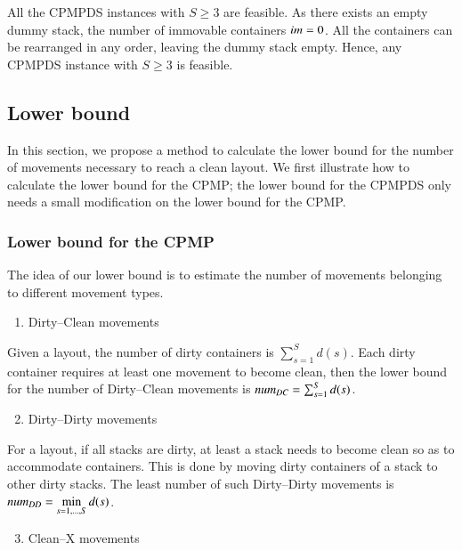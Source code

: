 \documentclass[review,3p,times,authoryear,12pt]{elsarticle}
\begin{document}
All the CPMPDS instances with $S\ge3$ are feasible. As there exists an empty dummy stack, the number of immovable containers $\id{im}=0$. All the containers can be rearranged in any order, leaving the dummy stack empty.
Hence, any CPMPDS instance with $S\ge3$ is feasible.

\subsection{Lower bound}

In this section, we propose a method to calculate the lower bound for the number of movements necessary to reach a clean layout. We first illustrate how to calculate the lower bound for the CPMP; the lower bound for the CPMPDS only needs a small modification on the lower bound for the CPMP.

\subsubsection{Lower bound for the CPMP}

The idea of our lower bound is to estimate the number of movements belonging to different movement types.
\begin{enumerate}
\setcounter{enumi}{0}
\item Dirty--Clean movements
\end{enumerate}

Given a layout, the number of dirty containers is $\sum_{s=1}^S d(s)$. Each dirty container requires at least one movement to become clean, then the lower bound for the number of Dirty--Clean movements is $\id{num}_\id{DC}=\sum_{s=1}^S d(s)$.

\begin{enumerate}
\setcounter{enumi}{1}
\item Dirty--Dirty movements
\end{enumerate}

For a layout, if all stacks are dirty, at least a stack needs to become clean so as to accommodate containers. This is done by moving dirty containers of a stack to other dirty stacks. The least number of such Dirty--Dirty movements is $\id{num}_\id{DD} = \min\limits_{s=1, \dots, S} d(s)$.

\begin{enumerate}
\setcounter{enumi}{2}
\item Clean--X movements
\end{enumerate}
\end{document}
